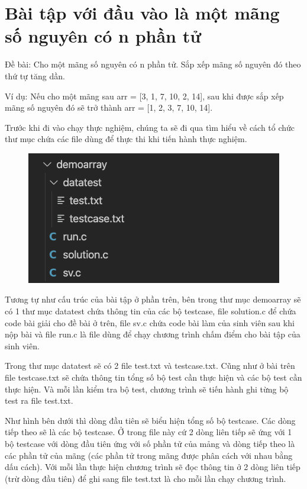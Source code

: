 \documentclass[12pt,a4paper]{report}
\begin{document}
\section{Bài tập với đầu vào là một mãng số nguyên có n phần tử}

Đề bài: Cho một mãng số nguyên có n phần tử. Sắp xếp mãng số nguyên đó theo thứ tự tăng dần.

Ví dụ: Nếu cho một mãng sau arr = [3, 1, 7, 10, 2, 14], sau khi được sắp xếp mãng số nguyên đó sẽ trở thành arr = [1, 2, 3, 7, 10, 14].

Trước khi đi vào chạy thực nghiệm, chúng ta sẽ đi qua tìm hiểu về cách tổ chức thư mục chứa các file dùng để thực thi khi tiến hành thực nghiệm.

\begin{figure}[ht]
\begin{center}
\includegraphics[scale=.3]{hinhanh/cautrucdemoarray.png}
\end{center}
\end{figure}

Tương tự như cấu trúc của bài tập ở phần trên, bên trong thư mục demoarray sẽ có 1 thư mục datatest chứa thông tin của các bộ testcase, file solution.c để chứa code bài giải cho đề bài ở trên, file sv.c chứa code bài làm của sinh viên sau khi nộp bài và file run.c là file dùng để chạy chương trình chấm điểm cho bài tập của sinh viên.

Trong thư mục datatest sẽ có 2 file test.txt và testcase.txt. Cũng như ở bài trên file testcase.txt sẽ chứa thông tin tổng số bộ test cần thực hiện và các bộ test cần thực hiện. Và mỗi lần kiểm tra bộ test, chương trình sẽ tiến hành ghi từng bộ test ra file test.txt.

Như hình bên dưới thì dòng đầu tiên sẽ biểu hiện tổng số bộ testcase. Các dòng tiếp theo sẽ là các bộ testcase. Ở trong file này cứ 2 dòng liên tiếp sẽ ứng với 1 bộ testcase với dòng đầu tiên ứng với số phần tử của mảng và dòng tiếp theo là các phần tử của mãng (các phần tử trong mãng được phân cách với nhau bằng dấu cách). Với mỗi lần thực hiện chương trình sẽ đọc thông tin ở 2 dòng liên tiếp (trừ dòng đầu tiên) để ghi sang file test.txt là cho mỗi lần chạy chương trình.
\end{document}
